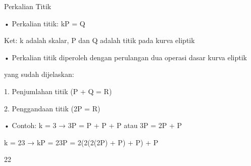 \documentclass{article}
\begin{document}

Perkalian Titik

• Perkalian titik:  kP = Q   

 Ket:  k adalah skalar, P dan Q adalah titik pada kurva eliptik

• Perkalian titik diperoleh dengan perulangan dua operasi dasar kurva eliptik 

yang sudah dijelaskan:

 1. Penjumlahan titik (P + Q = R)

 2. Penggandaan titik (2P = R)

• Contoh: k = 3 → 3P = P + P + P atau 3P = 2P + P 

    k = 23 → kP = 23P = 2(2(2(2P) + P) + P) + P

22
\end{document}
